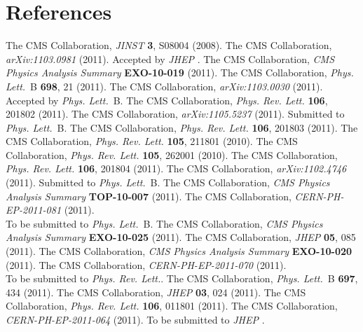 \documentclass[11pt]{article}
\def\Journal#1#2#3#4{{#1} {\bf #2}, #3 (#4)}
\def\PLB{{\em Phys. Lett.}~B}
\def\PRL{{\em Phys. Rev. Lett.}}
\def\PRD{{\em Phys. Rev.}~D}
\def\JINST{{\em JINST} }
\def\JHEP{{\em JHEP} }
\begin{document}
\section*{References}
\begin{thebibliography}{199}

The CMS Collaboration, \Journal{\JINST}{3}{S08004}{2008}.
The CMS Collaboration, {\em arXiv:1103.0981} (2011). Accepted by \JHEP.
The CMS Collaboration, {\em CMS Physics Analysis Summary} {\bf EXO-10-019} (2011).
The CMS Collaboration, \Journal{\PLB}{698}{21}{2011}.
The CMS Collaboration, {\em arXiv:1103.0030} (2011). Accepted by \PLB.
The CMS Collaboration, \Journal{\PRL}{106}{201802}{2011}.
The CMS Collaboration, {\em arXiv:1105.5237} (2011). Submitted to \PLB.
The CMS Collaboration, \Journal{\PRL}{106}{201803}{2011}.
The CMS Collaboration, \Journal{\PRL}{105}{211801}{2010}.
The CMS Collaboration, \Journal{\PRL}{105}{262001}{2010}.
The CMS Collaboration, \Journal{\PRL}{106}{201804}{2011}.
The CMS Collaboration, {\em arXiv:1102.4746} (2011). Submitted to \PLB.
The CMS Collaboration, {\em CMS Physics Analysis Summary} {\bf TOP-10-007} (2011).
The CMS Collaboration, {\em CERN-PH-EP-2011-081} (2011). \\To be submitted to \PLB.
The CMS Collaboration, {\em CMS Physics Analysis Summary} {\bf EXO-10-025} (2011).
The CMS Collaboration, \Journal{\JHEP}{05}{085}{2011}.
The CMS Collaboration, {\em CMS Physics Analysis Summary} {\bf EXO-10-020} (2011).
The CMS Collaboration, {\em CERN-PH-EP-2011-070} (2011). \\To be submitted to \PRL.
The CMS Collaboration, \Journal{\PLB}{697}{434}{2011}.
The CMS Collaboration, \Journal{\JHEP}{03}{024}{2011}.
The CMS Collaboration, \Journal{\PRL}{106}{011801}{2011}.
The CMS Collaboration, {\em CERN-PH-EP-2011-064} (2011). To be submitted to \JHEP.



\end{thebibliography}
\end{document}
